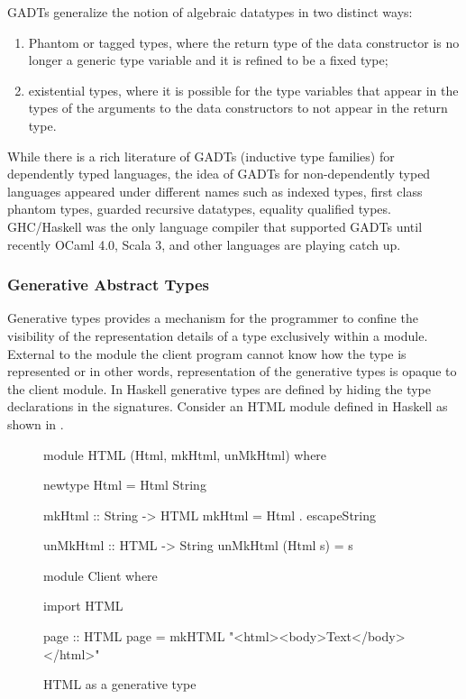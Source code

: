 \documentclass[screen,nonacm]{acmart}
\begin{document}
GADTs generalize the notion of algebraic datatypes in two distinct ways:
\begin{enumerate}
\item Phantom or tagged types, where the return type of the data constructor is no longer a generic type variable and it is refined to be a fixed type;
\item existential types, where it is possible for the type variables that appear in the types of the arguments to the data constructors to not appear in the return type.
\end{enumerate}

While there is a rich literature of GADTs (inductive type families) for dependently typed languages\cite{dybjer_inductive_1991, dybjer_inductive_1994}, the idea of GADTs for non-dependently typed languages appeared under different names such as indexed types\cite{zenger_indexed_1997}, first class phantom types\cite{cheney_first-class_2003}, guarded recursive datatypes\cite{xi_guarded_2003}, equality qualified types\cite{sheard_meta-programming_2008}. GHC/Haskell was the only language compiler that supported GADTs\cite{peyton_jones_wobbly_2004} until recently OCaml 4.0\cite{garrigue_gadt_2011}, Scala 3\cite{TODO}, and other languages are playing catch up.

\subsubsection{Generative Abstract Types}\label{subsubsec:gen-abs-types}
Generative types provides a mechanism for the programmer to confine the visibility of the representation details of a type exclusively within a module. External to the module the client program cannot know how the type is represented or in other words, representation of the generative types is opaque to the client module. In Haskell generative types are defined by hiding the type declarations in the signatures. Consider an HTML module defined in Haskell as shown in .
\begin{figure}[ht]
 \centering
 \begin{minipage}[ht]{0.4\linewidth}
 \begin{code}
 module HTML (Html, mkHtml, unMkHtml)
 where

 newtype Html = Html String

 mkHtml :: String -> HTML
 mkHtml = Html . escapeString

 unMkHtml :: HTML -> String
 unMkHtml (Html s) = s
 \end{code}
 \end{minipage}%
 \begin{minipage}[ht]{0.4\linewidth}
 \begin{code}
 module Client
 where

 import HTML

 page :: HTML
 page = mkHTML "<html><body>Text</body></html>"

 \end{code}
 \end{minipage}
 \caption{HTML as a generative type}
 \label{fig:html-generative-type}
\end{figure}
\end{document}
